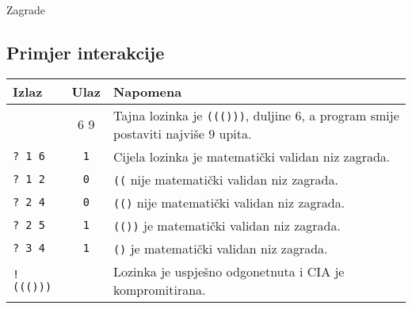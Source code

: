 \begin{statement}[
  problempoints=100,
  timelimit=3 sekunde,
  memorylimit=512 MiB,
]{Zagrade}
\subsection*{Primjer interakcije}
{\renewcommand{\arraystretch}{1.4}
  \setlength{\tabcolsep}{6pt}
  \begin{tabular}{lcl}
    Izlaz & Ulaz & Napomena \\ \midrule
      & 6 9 & Tajna lozinka je \texttt{((()))}, duljine 6, a program smije postaviti najviše $9$ upita. \\
    \texttt{\frenchspacing? 1 6} & \texttt{1} & Cijela lozinka je matematički validan niz zagrada. \\
    \texttt{\frenchspacing? 1 2} & \texttt{0} & \texttt{((} nije matematički validan niz zagrada. \\
    \texttt{\frenchspacing? 2 4} & \texttt{0} & \texttt{(()} nije matematički validan niz zagrada. \\
    \texttt{\frenchspacing? 2 5} & \texttt{1} & \texttt{(())} je matematički validan niz zagrada. \\
    \texttt{\frenchspacing? 3 4} & \texttt{1} & \texttt{()} je matematički validan niz zagrada. \\
    \texttt{\frenchspacing! ((()))} & & Lozinka je uspješno odgonetnuta i CIA je kompromitirana. \\
\end{tabular}}

\end{statement}

